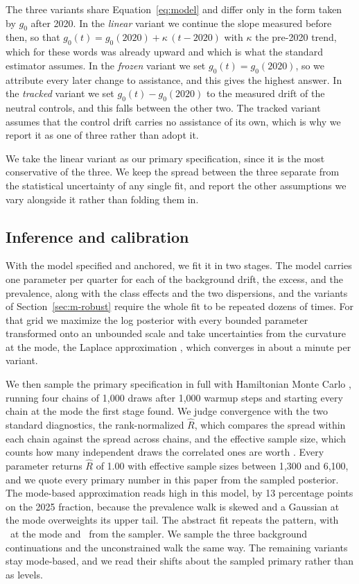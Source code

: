 \documentclass[twocolumn]{aastex631}
\begin{document}
The three variants share Equation~\ref{eq:model} and differ only in the form taken by $g_0$ after 2020. In the \textit{linear} variant we continue the slope measured before then, so that $g_0(t) = g_0(2020) + \kappa\,(t-2020)$ with $\kappa$ the pre-2020 trend, which for these words was already upward and which is what the standard estimator assumes. In the \textit{frozen} variant we set $g_0(t) = g_0(2020)$, so we attribute every later change to assistance, and this gives the highest answer. In the \textit{tracked} variant we set $g_0(t) - g_0(2020)$ to the measured drift of the neutral controls, and this falls between the other two. The tracked variant assumes that the control drift carries no assistance of its own, which is why we report it as one of three rather than adopt it.

We take the linear variant as our primary specification, since it is the most conservative of the three. We keep the spread between the three separate from the statistical uncertainty of any single fit, and report the other assumptions we vary alongside it rather than folding them in.



\subsection{Inference and calibration}\label{sec:m-inf}

With the model specified and anchored, we fit it in two stages. The model carries one parameter per quarter for each of the background drift, the excess, and the prevalence, along with the class effects and the two dispersions, and the variants of Section~\ref{sec:m-robust} require the whole fit to be repeated dozens of times. For that grid we maximize the log posterior with every bounded parameter transformed onto an unbounded scale and take uncertainties from the curvature at the mode, the Laplace approximation \citep[cf.][]{Gelman2013}, which converges in about a minute per variant.

We then sample the primary specification in full with Hamiltonian Monte Carlo \citep{Neal2011, Hoffman2014, Betancourt2017}, running four chains of 1{,}000 draws after 1{,}000 warmup steps and starting every chain at the mode the first stage found. We judge convergence with the two standard diagnostics, the rank-normalized $\widehat{R}$, which compares the spread within each chain against the spread across chains, and the effective sample size, which counts how many independent draws the correlated ones are worth \citep{Vehtari2021}. Every parameter returns $\widehat{R}$ of 1.00 with effective sample sizes between 1{,}300 and 6{,}100, and we quote every primary number in this paper from the sampled posterior. The mode-based approximation reads high in this model, by 13 percentage points on the 2025 fraction, because the prevalence walk is skewed and a Gaussian at the mode overweights its upper tail. The abstract fit repeats the pattern, with \piAbstractsHeadline\ at the mode and \piAbstractsNuts\ from the sampler. We sample the three background continuations and the unconstrained walk the same way. The remaining variants stay mode-based, and we read their shifts about the sampled primary rather than as levels.
\end{document}
